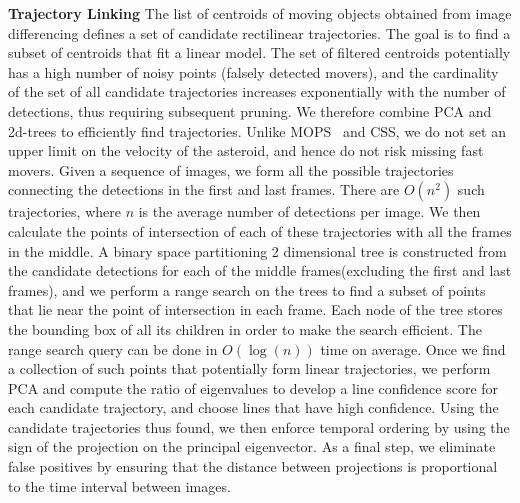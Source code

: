 \documentclass{article}
\begin{document}
{\bf Trajectory Linking}
The list of centroids of moving objects obtained from image differencing defines a set of candidate rectilinear trajectories.  The goal is to find a subset of centroids that fit a linear model.  The set of filtered centroids potentially has a high number of noisy points (falsely detected movers), and the cardinality of the set of all candidate trajectories increases exponentially with the number of detections, thus requiring subsequent pruning. We therefore combine PCA and 2d-trees to efficiently find trajectories. Unlike MOPS~\cite{denneau2013pan} and CSS\cite{css2014}, we do not set an upper limit on the velocity of the asteroid, and hence do not risk missing fast movers. Given a sequence of images, we form all the possible trajectories connecting the detections in the first and last frames. There are $O(n^2)$ such trajectories, where $n$ is the average number of detections per image. We then calculate the points of intersection of each of these trajectories with all the frames in the middle. A binary space partitioning 2 dimensional tree is constructed from the candidate detections for each of the middle frames(excluding the first and last frames), and we perform a range search on the trees to find a subset of points that lie near the point of intersection in each frame. Each node of the tree stores the bounding box of all its children in order to make the search efficient. The range search query can be done in $O(\log(n))$ time on average. Once we find a collection of such points that potentially form linear trajectories, we perform PCA and compute the ratio of eigenvalues to develop a line confidence score for each candidate trajectory, and choose lines that have high confidence. Using the candidate trajectories thus found, we then enforce temporal ordering by using the sign of the projection on the principal eigenvector.  As a final step, we eliminate false positives by ensuring that the distance between projections is proportional to the time interval between images. 
\end{document}
